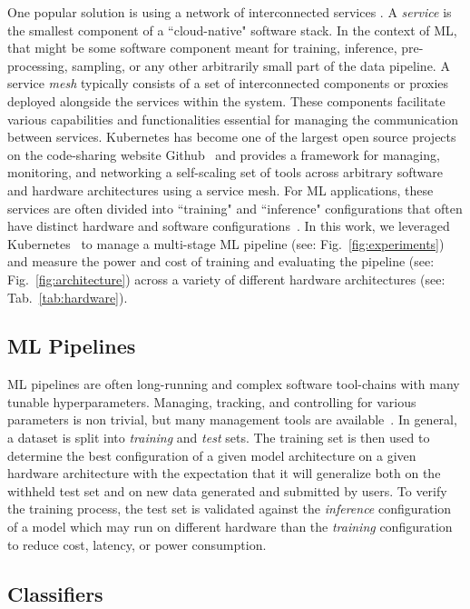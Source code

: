 \documentclass[conference]{IEEEtran}
\begin{document}
One popular solution is using a network of interconnected services \cite{panchal2024reusable,hasselbring2017microservice,zhong2022machine,singh2023load}. A \textit{service} is the smallest component of a ``cloud-native" software stack. In the context of ML, that might be some software component meant for training, inference, pre-processing, sampling, or any other arbitrarily small part of the data pipeline. 
A service \textit{mesh} typically consists of a set of interconnected components or proxies deployed alongside the services within the system.  These components facilitate various capabilities and functionalities essential for managing the communication between services. Kubernetes has become one of the largest open source projects on the code-sharing website Github~\cite{k8s-size} and provides a framework for managing, monitoring, and networking a self-scaling set of tools across arbitrary software and hardware architectures using a service mesh. For ML applications, these services are often divided into ``training" and ``inference" configurations that often have distinct hardware and software configurations~\cite{wang2019benchmarking}. In this work, we leveraged Kubernetes~\cite{k8s} to manage a multi-stage ML pipeline (see: Fig.~\ref{fig:experiments}) and measure the power and cost of training and evaluating the pipeline (see: Fig.~\ref{fig:architecture}) across a variety of different hardware architectures (see: Tab.~\ref{tab:hardware}).


\subsection{ML Pipelines}
ML pipelines are often long-running and complex software tool-chains with many tunable hyperparameters. Managing, tracking, and controlling for various parameters is non trivial, but many management tools are available~\cite{dvc,hydra,k8s}. In general, a dataset is split into \textit{training} and \textit{test} sets. The training set is then used to determine the best configuration of a given model architecture on a given hardware architecture with the expectation that it will generalize both on the withheld test set and on new data generated and submitted by users. To verify the training process, the test set is validated against the \textit{inference} configuration of a model which may run on different hardware than the \textit{training} configuration to reduce cost, latency, or power consumption. 

\subsection{Classifiers}
\end{document}
